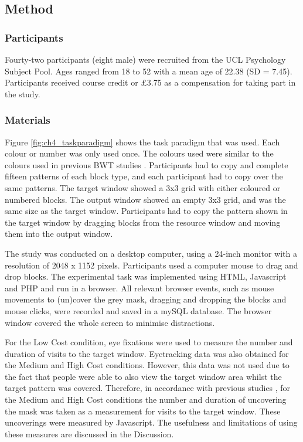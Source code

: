 \subsection{Method}
\subsubsection{Participants}
Fourty-two participants (eight male) were recruited from the UCL Psychology Subject Pool. Ages ranged from 18 to 52 with a mean age of 22.38 (SD = 7.45). Participants received course credit or \pounds3.75 as a compensation for taking part in the study.

\subsubsection{Materials}
Figure \ref{fig:ch4_taskparadigm} shows the task paradigm that was used. Each colour or number was only used once. The colours used were similar to the colours used in previous BWT studies \citep[e.g.][]{Gray2006, Morgan2009}.
Participants had to copy and complete fifteen patterns of each block type, and each participant had to copy over the same patterns. The target window showed a 3x3 grid with either coloured or numbered blocks. The output window showed an empty 3x3 grid, and was the same size as the target window. Participants had to copy the pattern shown in the target window by dragging blocks from the resource window and moving them into the output window. 

The study was conducted on a desktop computer, using a 24-inch monitor with a resolution of 2048 x 1152 pixels. Participants used a computer mouse to drag and drop blocks. The experimental task was implemented using HTML, Javascript and PHP and run in a browser.  All relevant browser events, such as mouse movements to (un)cover the grey mask, dragging and dropping the blocks and mouse clicks, were recorded and saved in a mySQL database. The browser window covered the whole screen to minimise distractions.

For the Low Cost condition, eye fixations were used to measure the number and duration of visits to the target window. Eyetracking data was also obtained for the Medium and High Cost conditions. However, this data was not used due to the fact that people were able to also view the target window area whilst the target pattern was covered. Therefore, in accordance with previous studies \citep[e.g.][]{Gray2004}, for the Medium and High Cost conditions the number and duration of uncovering the mask was taken as a measurement for visits to the target window.  These uncoverings were measured by Javascript. The usefulness and limitations of using these measures are discussed in the Discussion.


